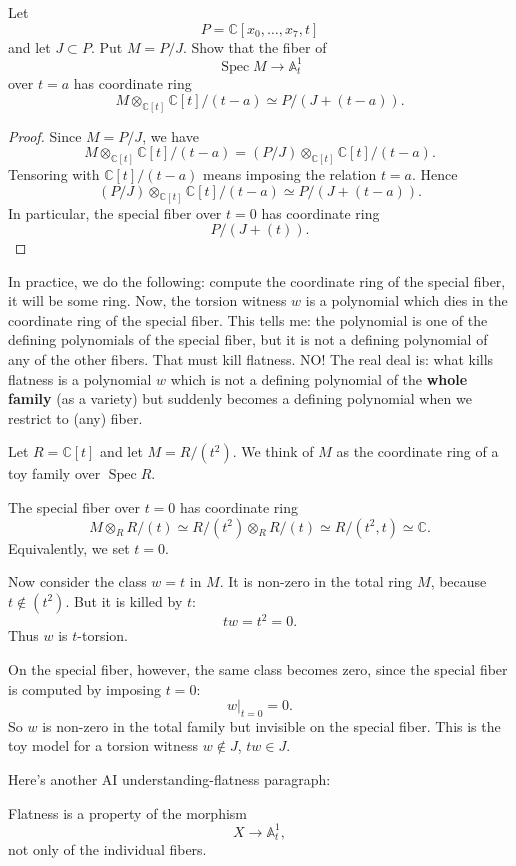 \begin{exercise}
Let
$$
P=\mathbb{C}[x_0,\dots,x_7,t]
$$
and let $J\subset P$. Put $M=P/J$.
Show that the fiber of
$$
\operatorname{Spec} M\longrightarrow
\mathbb{A}^1_t
$$
over $t=a$ has coordinate ring
$$
M\otimes_{\mathbb{C}[t]}
\mathbb{C}[t]/(t-a)
\simeq
P/(J+(t-a)).
$$
\end{exercise}

\begin{proof}
Since $M=P/J$, we have
$$
M\otimes_{\mathbb{C}[t]}
\mathbb{C}[t]/(t-a)
=
(P/J)\otimes_{\mathbb{C}[t]}
\mathbb{C}[t]/(t-a).
$$
Tensoring with $\mathbb{C}[t]/(t-a)$ means
imposing the relation $t=a$. Hence
$$
(P/J)\otimes_{\mathbb{C}[t]}
\mathbb{C}[t]/(t-a)
\simeq
P/(J+(t-a)).
$$
In particular, the special fiber over $t=0$
has coordinate ring
$$
P/(J+(t)).
$$
\end{proof}

\medskip\noindent
In practice, we do the following:
compute the coordinate ring of the special
fiber, it will be some ring.
Now, the torsion witness $w$ is a polynomial
which dies in the coordinate ring
of the special fiber.
This tells me: the polynomial is one of
the defining polynomials of the special
fiber, but it is not a defining polynomial
of any of the other fibers.
That must kill flatness.
NO! The real deal is:
what kills flatness is a polynomial $w$
which is not a defining polynomial
of the {\bf whole family} (as a variety)
but suddenly becomes a defining polynomial
when we restrict to (any) fiber.

Let $R=\mathbb{C}[t]$ and let
$M=R/(t^2)$. We think of $M$ as the
coordinate ring of a toy family over
$\operatorname{Spec} R$.

The special fiber over $t=0$ has coordinate
ring
$$
M\otimes_R R/(t)
\simeq R/(t^2)\otimes_R R/(t)
\simeq R/(t^2,t)
\simeq \mathbb{C}.
$$
Equivalently, we set $t=0$.

Now consider the class $w=t$ in $M$. It is
non-zero in the total ring $M$, because
$t\notin (t^2)$. But it is killed by $t$:
$$
tw=t^2=0.
$$
Thus $w$ is $t$-torsion.

On the special fiber, however, the same class
becomes zero, since the special fiber is
computed by imposing $t=0$:
$$
w|_{t=0}=0.
$$
So $w$ is non-zero in the total family but
invisible on the special fiber. This is the
toy model for a torsion witness
$w\notin J$, $tw\in J$.

\medskip\noindent
Here's another AI understanding-flatness
paragraph:

Flatness is a property of the morphism
$$
X \longrightarrow \mathbb{A}^1_t,
$$
not only of the individual fibers.

